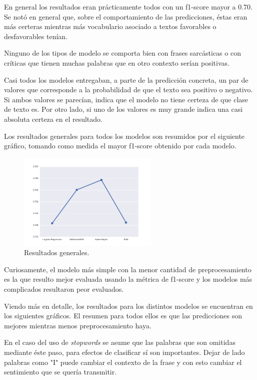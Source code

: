 \documentclass[11pt,letterpaper]{article}
\begin{document}
En general los resultados eran prácticamente todos con un f1-score mayor a
0.70. Se notó en general que, sobre el comportamiento de las predicciones,
éstas eran más certeras mientras más vocabulario asociado a textos favorables
o desfavorables tenían. 

Ninguno de los tipos de modelo se comporta bien con frases sarcásticas o con
críticas que tienen muchas palabras que en otro contexto serían positivas.

Casi todos los modelos entregaban, a parte de la predicción concreta, un par
de valores que corresponde a la probabilidad de que el texto sea positivo o
negativo. Si ambos valores se parecían, indica que el modelo no tiene certeza
de que clase de texto es. Por otro lado, si uno de los valores es muy grande
indica una casi absoluta certeza en el resultado.

Los resultados generales para todos los modelos son resumidos por el
siguiente gráfico, tomando como medida el mayor f1-score obtenido por cada
modelo.
\begin{figure}[htb]
\centering
\includegraphics[width=0.6\textwidth]{p2_general.png}
\caption{Resultados generales.}
\end{figure} 

Curiosamente, el modelo más simple con la menor cantidad de preprocesamiento
es la que resulto mejor evaluada usando la métrica de f1-score y los modelos
más complicados resultaron peor evaluados. 

Viendo más en detalle, los resultados para los distintos modelos se
encuentran en los siguientes gráficos. El resumen para todos ellos es que
las predicciones son mejores mientras menos preprocesamiento haya.

En el caso del uso de \emph{stopwords} se asume que las palabras que son omitidas
mediante éste paso, para efectos de clasificar sí son importantes. Dejar de
lado palabras como "I" puede cambiar el contexto de la frase y con esto
cambiar el sentimiento que se quería transmitir.
\end{document}
